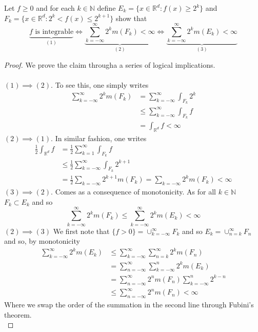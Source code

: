 \documentclass[nocolor]{report}
\begin{document}
\begin{ex}[Question 4a.] Let $f\geq 0$ and for each $k\in\mathbb{N}$ define $E_k = \{x\in\mathbb{R}^d: f(x)\geq 2^k\}$ and $F_k = \{x\in\mathbb{R}^d : 2^k < f(x) \leq 2^{k+1}\}$  show that 
$$\underbrace{\text{$f$ is integrable}}_{(1)} \iff \underbrace{\sum_{k=-\infty}^{\infty}2^k m(F_k) < \infty}_{(2)} \iff  \underbrace{\sum_{k=-\infty}^{\infty}2^{k} m(E_k) < \infty}_{(3)}$$
\end{ex}
\begin{proof}
We prove the claim througha a series of logical implications. \\
\\
$(1)\implies(2)$. To see this, one simply writes
\begin{align*}
    \sum_{k=-\infty}^{\infty}2^{k} m(F_k) &= \sum_{k=-\infty}^{\infty}\int_{F_k} 2^k \\
    &\leq \sum_{k=-\infty}^{\infty} \int_{F_k} f \\
    &= \int_{\mathbb{R}^d} f < \infty
\end{align*}
$(2)\implies(1)$. In similar fashion, one writes
\begin{align*}
    \frac{1}{2}\int_{\mathbb{R}^d} f &= \frac{1}{2} \sum_{k=1}^{\infty} \int_{F_k} f \\
    &\leq \frac{1}{2}\sum_{k=-\infty}^{\infty}\int_{F_k}2^{k+1} \\
    &= \frac{1}{2}\sum_{k=-\infty} 2^{k+1}m(F_k) = \sum_{k=-\infty} 2^{k}m(F_k) < \infty
\end{align*}
$(3)\implies(2).$ Comes as a consequence of monotonicity. As for all $k\in\mathbb{N}$ $F_k\subset E_k$ and so
$$\sum_{k=-\infty}^{\infty}2^k m(F_k) \leq \sum_{k=-\infty}^{\infty}2^k m(E_k) < \infty$$
$(2)\implies(3)$ We first note that $\{f > 0\} = \cup_{k=-\infty}^{\infty} F_k$ and so $E_k = \cup_{n=k}^{\infty}F_n$ and so, by monotonicity
\begin{align*}
    \sum_{k=-\infty}^{\infty}2^k m(E_k) &\leq \sum_{k=-\infty}^{\infty}\sum_{n=k}^{\infty}2^k m(F_n) \\
    &= \sum_{n=-\infty}^{\infty}\sum_{k=-\infty}^{n}2^k m(E_k) \\
    &=  \sum_{n=-\infty}^{\infty} 2^n m(F_n) \sum_{k=-\infty}^{n} 2^{k-n} \\
    &\leq  \sum_{n=-\infty}^{\infty} 2^n m(F_n) < \infty
\end{align*}
Where we swap the order of the summation in the second line through Fubini's theorem. \\
\end{proof}
\end{document}
